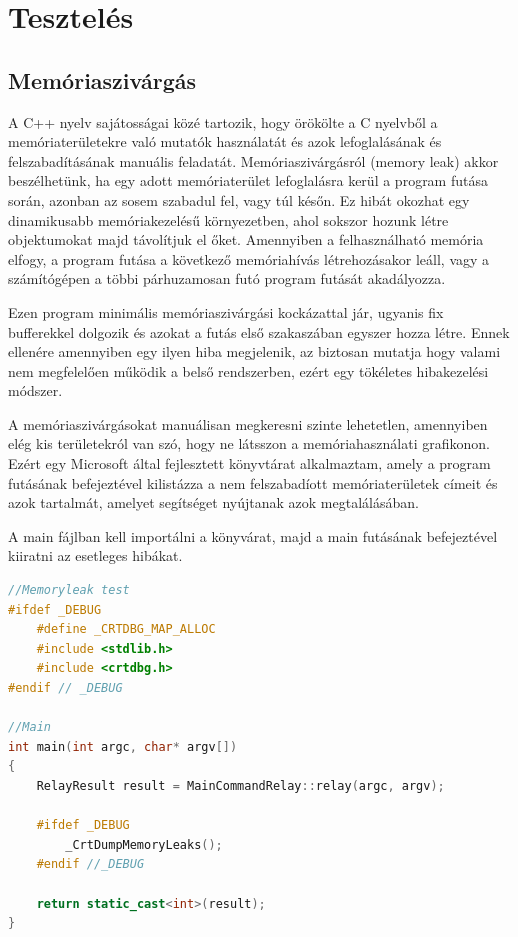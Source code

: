 \chapter{Tesztelés} %


\section{Memóriaszivárgás}

A C++ nyelv sajátosságai közé tartozik, hogy örökölte a C nyelvből a memóriaterületekre való mutatók használatát és azok lefoglalásának és felszabadításának manuális feladatát. Memóriaszivárgásról (memory leak) akkor beszélhetünk, ha egy adott memóriaterület lefoglalásra kerül a program futása során, azonban az sosem szabadul fel, vagy túl későn. Ez hibát okozhat egy dinamikusabb memóriakezelésű környezetben, ahol sokszor hozunk létre objektumokat majd távolítjuk el őket. Amennyiben a felhasználható memória elfogy, a program futása a következő memóriahívás létrehozásakor leáll, vagy a számítógépen a többi párhuzamosan futó program futását akadályozza.

Ezen program minimális memóriaszivárgási kockázattal jár, ugyanis fix bufferekkel dolgozik és azokat a futás első szakaszában egyszer hozza létre. Ennek ellenére amennyiben egy ilyen hiba megjelenik, az biztosan mutatja hogy valami nem megfelelően működik a belső rendszerben, ezért egy tökéletes hibakezelési módszer.

A memóriaszivárgásokat manuálisan megkeresni szinte lehetetlen, amennyiben elég kis területekról van szó, hogy ne látsszon a memóriahasználati grafikonon. Ezért egy Microsoft által fejlesztett könyvtárat alkalmaztam, amely a program futásának befejeztével kilistázza a nem felszabadíott memóriaterületek címeit és azok tartalmát, amelyet segítséget nyújtanak azok megtalálásában.

A main fájlban kell importálni a könyvárat, majd a main futásának befejeztével kiiratni az esetleges hibákat.

\begin{lstlisting}[language={C++}]
//Memoryleak test
#ifdef _DEBUG
	#define _CRTDBG_MAP_ALLOC
	#include <stdlib.h>
	#include <crtdbg.h>
#endif // _DEBUG

//Main
int main(int argc, char* argv[])
{
	RelayResult result = MainCommandRelay::relay(argc, argv);

	#ifdef _DEBUG
		_CrtDumpMemoryLeaks();
	#endif //_DEBUG

	return static_cast<int>(result);
}
\end{lstlisting}


